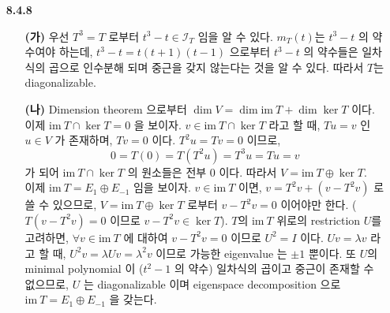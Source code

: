 \documentclass[12pt]{report}
\newcommand*{\im}{\text{im}\:}%
\begin{document}
\begin{itemize}
\item[\textbf{8.4.8}]
	\begin{itemize}
		\item[\textbf{(가)}] 우선 $T^3=T$ 로부터 $t^3-t \in \mathcal{I}_T$ 임을 알 수 있다. $m_T(t)$는 $t^3-t$ 의 약수여야 하는데, $t^3-t = t(t+1)(t-1)$ 으로부터 $t^3-t$ 의 약수들은 일차식의 곱으로 인수분해 되며 중근을 갖지 않는다는 것을 알 수 있다. 따라서 $T$는 diagonalizable.
		\item[\textbf{(나)}] Dimension theorem 으로부터 $\dim V = \dim \im T + \dim\ker T$ 이다. \\이제 $\im T \cap \ker T = 0$ 을 보이자. $v \in \im T \cap \ker T$ 라고 할 때, $Tu = v$ 인 $u\in V$ 가 존재하며, $Tv= 0$ 이다. $T^2u = Tv = 0$ 이므로, $$0 = T(0) = T(T^2u) = T^3u = Tu = v$$ 가 되어 $\im T \cap \ker T$ 의 원소들은 전부 $0$ 이다. 따라서 $V = \im T \oplus \ker T$. \\ 이제 $\im T = E_1 \oplus E_{-1}$ 임을 보이자. $v\in \im T$ 이면, $v = T^2v + (v - T^2v)$ 로 쓸 수 있으므로, $V = \im T \oplus \ker T$ 로부터 $v - T^2v = 0$ 이어야만 한다. ($T(v-T^2v) = 0$ 이므로 $v-T^2v\in \ker T$). $T$의 $\im T$ 위로의 restriction $U$를 고려하면, $\forall v\in \im T$ 에 대하여 $v-T^2v=0$ 이므로 $U^2=I$ 이다. $Uv=\lambda v$ 라고 할 때, $U^2v = \lambda Uv = \lambda^2v$ 이므로 가능한 eigenvalue 는 $\pm 1$ 뿐이다. 또 $U$의 minimal polynomial 이 ($t^2-1$ 의 약수) 일차식의 곱이고 중근이 존재할 수 없으므로, $U$ 는 diagonalizable 이며 eigenspace decomposition 으로 $\im T = E_1 \oplus E_{-1}$ 을 갖는다.
	\end{itemize}
	

\end{itemize}
\end{document}

